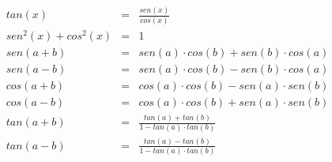  \begin{eqnarray*}
  tan(x)&=&\frac{sen(x)}{cos(x)} \\
  sen^2(x) + cos^2(x)&=&1 \\
  sen(a+b)&=&sen(a)\cdot cos(b)+sen(b)\cdot cos(a) \\
  sen(a-b)&=&sen(a)\cdot cos(b)-sen(b)\cdot cos(a) \\
  cos(a+b)&=&cos(a)\cdot cos(b)-sen(a)\cdot sen(b) \\
  cos(a-b)&=&cos(a)\cdot cos(b)+sen(a)\cdot sen(b) \\
  tan(a+b)&=& \frac{tan(a)+tan(b)}{1-tan(a)\cdot tan(b)} \\
  tan(a-b)&=& \frac{tan(a)-tan(b)}{1-tan(a)\cdot tan(b)}
 \end{eqnarray*}
 

